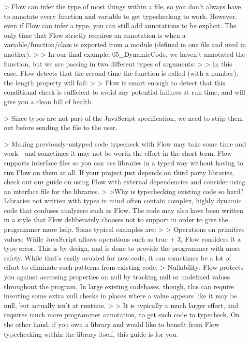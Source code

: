 
  > Flow can infer the type of most things within a file, so you don't always have to annotate every function and variable to get typechecking to work. However, even if Flow can infer a type, you can still add annotations to be explicit. The only time that Flow strictly requires an annotation is when a variable/function/class is exported from a module (defined in one file and used in another).
  >
  > In our final example, 05\_DynamicCode, we haven't annotated the function, but we are passing in two different types of arguments:
  >
  > In this case, Flow detects that the second time the function is called (with a number), the length property will fail:
  >
  > Flow is smart enough to detect that this conditional check is sufficient to avoid any potential failures at run time, and will give you a clean bill of health.


  > Since types are not part of the JavaScript specification, we need to strip them out before sending the file to the user.


  > Making previously-untyped code typecheck with Flow may take some time and work - and sometimes it may not be worth the effort in the short term. Flow supports interface files so you can use libraries in a typed way without having to run Flow on them at all. If your project just depends on third party libraries, check out our guide on using Flow with external dependencies and consider using an interface file for the libraries.
  >
  >Why is typechecking existing code so hard? Libraries not written with types in mind often contain complex, highly dynamic code that confuses analyzers such as Flow. The code may also have been written in a style that Flow deliberately chooses not to support in order to give the programmer more help. Some typical examples are:
  >
  >    Operations on primitive values: While JavaScript allows operations such as true + 3, Flow considers it a type error. This is by design, and is done to provide the programmer with more safety. While that's easily avoided for new code, it can sometimes be a lot of effort to eliminate such patterns from existing code.
  >    Nullability: Flow protects you against accessing properties on null by tracking null or undefined values throughout the program. In large existing codebases, though, this can require inserting some extra null checks in places where a value appears like it may be null, but actually isn't at runtime.
  >
  > It is typically a much larger effort, and requires much more programmer annotation, to get such code to typecheck. On the other hand, if you own a library and would like to benefit from Flow typechecking within the library itself, this guide is for you.

